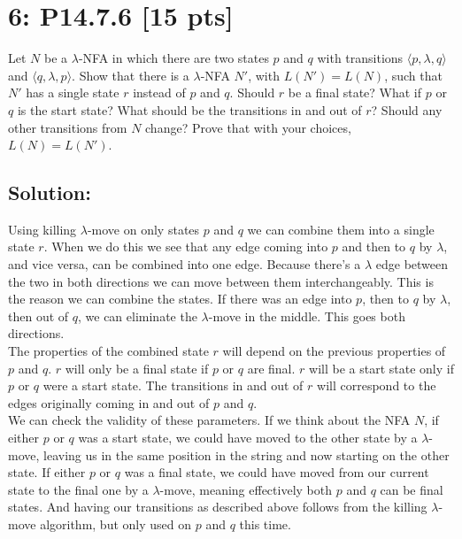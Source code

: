 \documentclass[12pt]{article}
\begin{document}
\newpage
\section*{\textbf{6: P14.7.6} [15 pts]}
Let $N$ be a $\lambda$-NFA in which there are two states $p$ and $q$ with transitions $\langle p, \lambda, q \rangle$ and $\langle q, \lambda, p \rangle$. Show that there is a $\lambda$-NFA $N'$, with $L(N') = L(N)$, such that $N'$ has a single state $r$ instead of $p$ and $q$. Should $r$ be a final state? What if $p$ or $q$ is the start state? What should be the transitions in and out of $r$? Should any other transitions from $N$ change? Prove that with your choices, $L(N) = L(N')$.


\subsection*{\textbf{Solution:}}
Using killing $\lambda$-move on only states $p$ and $q$ we can combine them into a single state $r$. When we do this we see that any edge coming into $p$ and then to $q$ by $\lambda$, and vice versa, can be combined into one edge. Because there's a $\lambda$ edge between the two in both directions we can move between them interchangeably. This is the reason we can combine the states. If there was an edge into $p$, then to $q$ by $\lambda$, then out of $q$, we can eliminate the $\lambda$-move in the middle. This goes both directions.\\

The properties of the combined state $r$ will depend on the previous properties of $p$ and $q$. $r$ will only be a final state if $p$ or $q$ are final. $r$ will be a start state only if $p$ or $q$ were a start state. The transitions in and out of $r$ will correspond to the edges originally coming in and out of $p$ and $q$. \\

We can check the validity of these parameters. If we think about the NFA $N$, if either $p$ or $q$ was a start state, we could have moved to the other state by a $\lambda$-move, leaving us in the same position in the string and now starting on the other state. If either $p$ or $q$ was a final state, we could have moved from our current state to the final one by a $\lambda$-move, meaning effectively both $p$ and $q$ can be final states. And having our transitions as described above follows from the killing $\lambda$-move algorithm, but only used on $p$ and $q$ this time. \\
\end{document}
